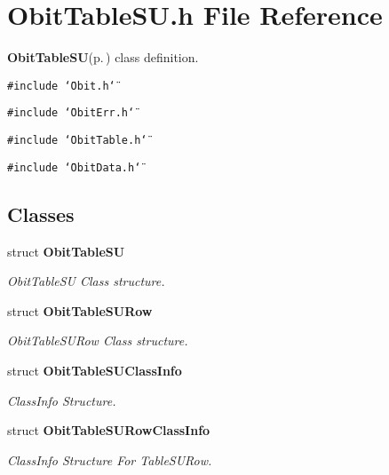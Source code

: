 \section{Obit\-Table\-SU.h File Reference}
\label{ObitTableSU_8h}
{\bf Obit\-Table\-SU}{\rm (p.\,\pageref{structObitTableSU})} class definition. 

{\tt \#include \char`\"{}Obit.h\char`\"{}}\par
{\tt \#include \char`\"{}Obit\-Err.h\char`\"{}}\par
{\tt \#include \char`\"{}Obit\-Table.h\char`\"{}}\par
{\tt \#include \char`\"{}Obit\-Data.h\char`\"{}}\par
\subsection*{Classes}
\begin{CompactItemize}
\item 
struct {\bf Obit\-Table\-SU}
\begin{CompactList}\small\item\em Obit\-Table\-SU Class structure. \item\end{CompactList}\item 
struct {\bf Obit\-Table\-SURow}
\begin{CompactList}\small\item\em Obit\-Table\-SURow Class structure. \item\end{CompactList}\item 
struct {\bf Obit\-Table\-SUClass\-Info}
\begin{CompactList}\small\item\em Class\-Info Structure. \item\end{CompactList}\item 
struct {\bf Obit\-Table\-SURow\-Class\-Info}
\begin{CompactList}\small\item\em Class\-Info Structure For Table\-SURow. \item\end{CompactList}\end{CompactItemize}
